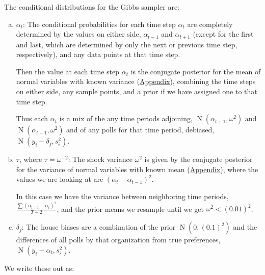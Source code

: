 \documentclass[12pt]{report}
\DeclareMathOperator{\N}{N}
\begin{document}
The conditional distributions for the Gibbs sampler are:
\begin{enumerate}[(a)]
  \item $\alpha_t$: The conditional probabilities for each time step $\alpha_t$ are completely determined by the values on either side, $\alpha_{t-1}$ and $\alpha_{t+1}$ (except for the first and last, which are determined by only the next or previous time step, respectively), and any data points at that time step.

Then the value at each time step $\alpha_t$ is the conjugate posterior for the mean of normal variables with known variance (\hyperref[sec:conj:gaussianwithprecision]{Appendix}), combining the time steps on either side, any sample points, and a prior if we have assigned one to that time step.

Thus each $\alpha_t$ is a mix of the any time periods adjoining, $\N(\alpha_{t+1}, \omega^2)$ and $\N(\alpha_{t-1}, \omega^2)$ and of any polls for that time period, debiased, $\N(y_i - \delta_j, s_i^2)$.
    
  \item $\tau$, where $\tau = \omega^{-2}$: The shock variance $\omega^2$ is given by the conjugate posterior for the variance of normal variables with known mean (\hyperref[sec:conj:gaussianwithmean]{Appendix}), where the values we are looking at are $(\alpha_t - \alpha_{t-1})^2$.

  In this case we have the variance between neighboring time periods, $\frac{\sum(\alpha_{t+1} - \alpha_t)^2}{T-2}$, and the prior means we resample until we get $\omega^2 < (0.01)^2$.
  
  \item $\delta_j$: The house biases are a combination of the prior $\N(0, (0.1)^2)$ and the differences of all polls by that organization from true preferences, $\N(y_i - \alpha_t, s_i^2)$.
\end{enumerate}
We write these out as:
\end{document}
